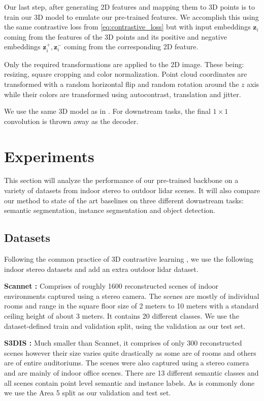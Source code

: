 \documentclass[10pt,twocolumn,letterpaper]{article}
\begin{document}
Our last step, after generating 2D features and mapping them to 3D points is to train our 3D model to emulate our pre-trained features. We accomplish this using the same contrastive loss from \ref{eq:contrastive_loss} but with input embeddings $\mathbf{z}_i$ coming from the features of the 3D points and its positive and negative embeddings $\mathbf{z}_i^{+},\mathbf{z}_i^{-}$ coming from the corresponding 2D feature.

Only the required transformations are applied to the 2D image. These being: resizing, square cropping and color normalization. Point cloud coordinates are transformed with a random horizontal flip and random rotation around the $z$ axis while their colors are transformed using autocontrast, translation and jitter.

We use the same 3D model as in \cite{xie2020pointcontrast}. For downstream tasks, the final $1\times1$ convolution is thrown away as the decoder.

\section{Experiments}
\label{sec:results}

This section will analyze the performance of our pre-trained backbone on a variety of datasets from indoor stereo to outdoor lidar scenes. It will also compare our method to state of the art baselines on three different downstream tasks: semantic segmentation, instance segmentation and object detection.

\subsection{Datasets}
\label{sec:results:datasets}

Following the common practice of 3D contrastive learning \cite{xie2020pointcontrast, hou2021Exploring, zhang2021Self, jiang2021Guided}, we use the following indoor stereo datasets and add an extra outdoor lidar dataset.

\textbf{Scannet \cite{Dai2017ScanNet}:} Comprises of roughly 1600 reconstructed scenes of indoor environments captured using a stereo camera. The scenes are mostly of individual rooms and range in the square floor size of 2 meters to 10 meters with a standard ceiling height of about 3 meters. It contains 20 different classes. We use the dataset-defined train and validation split, using the validation as our test set.

\textbf{S3DIS \cite{armeni20163D}:} Much smaller than Scannet, it comprises of only 300 reconstructed scenes however their size varies quite drastically as some are of rooms and others are of entire auditoriums. The scenes were also captured using a stereo camera and are mainly of indoor office scenes. There are 13 different semantic classes and all scenes contain point level semantic and instance labels. As is commonly done \cite{xie2020pointcontrast, hou2021Exploring} we use the Area 5 split as our validation and test set.
\end{document}
